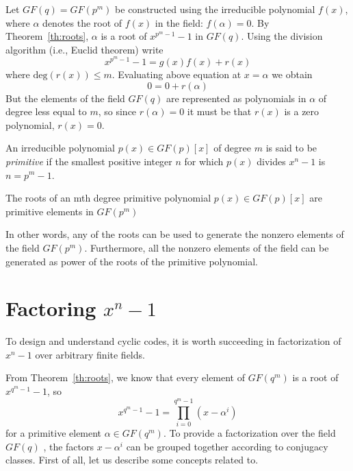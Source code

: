 Let \(GF(q)=GF(p^m) \) be constructed using the irreducible polynomial \(f(x)\), where \(\alpha\) denotes the root of \(f(x)\) in the field: \(f(\alpha)= 0\). By Theorem~\ref{th:roots}, $\alpha$ is a root of \(x^{p^m-1}-1\) in \(GF(q)\). Using the division algorithm (i.e., Euclid theorem) write
\begin{equation}
x^{p^m-1}-1= g(x)f(x)+r(x)
\end{equation}
where \( \mathrm{deg}(r(x)) \le m\). Evaluating above equation at \(x=\alpha\) we obtain
\[
0 = 0 + r(\alpha)
\]
But the elements of the field \(GF(q)\) are represented as polynomials in $\alpha$ of degree less equal to \(m\), so since \(r(\alpha)= 0\) it must be that \(r(x)\) is a zero polynomial, \(r(x) = 0\).

\begin{Def}
An irreducible polynomial \(p(x) \in GF(p)[x] \) of degree \(m\) is said to be \emph{primitive} if the smallest positive integer \(n\) for which \(p(x)\) divides \(x^n-1\) is \(n=p^m-1\).
\end{Def}

\begin{Theorem}
The roots of an mth degree primitive polynomial \( p(x) \in GF(p)[x] \) are primitive elements in \(GF(p^m)\)
\end{Theorem}
In other words, any of the roots can be used to generate the nonzero elements of the field \(GF(p^m)\). Furthermore, all the nonzero elements of the field can be generated as power of the roots of the primitive polynomial.

\section{Factoring $x^n-1$ } \label{sec:factoring}

To design and understand cyclic codes, it is worth succeeding in factorization of \(x^n-1\) over arbitrary finite fields.

From Theorem~\ref{th:roots}, we know that every element of \(GF(q^m) \) is a root of \(x^{q^m-1}-1\), so \[
x^{q^m-1}-1= \prod_{i=0}^{q^m-1} {(x-\alpha^i)}
\]
for a primitive element \( \alpha \in GF(q^m) \). To provide a factorization over the field \(GF(q)\) , the factors \(x-\alpha^i\) can be grouped together according to conjugacy classes. First of all, let us describe some concepts related to.

